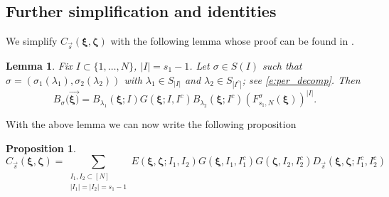 \documentclass[a4paper,11pt]{article}
\newtheorem{proposition}[theorem]{Proposition}
\newtheorem{lemma}[theorem]{Lemma}
\theoremstyle{definition}
\begin{document}
\subsection{Further simplification and identities}
We simplify $C_{\vec{s}}(\boldsymbol{\xi},\boldsymbol{\zeta})$ with the following lemma whose proof can be found in . 
\begin{lemma}\label{l:BDecomp} 
Fix $I\subset\{1,\ldots,N\}$, $|I| = s_1-1$. Let $\sigma\in S(I)$ such that $\sigma=(\sigma_1(\lambda_1),\sigma_2(\lambda_2))$ with $\lambda_1\in S_{|I|}$ and $\lambda_2\in S_{|I^c|}$; see \eqref{e:per_decomp}. Then
    \begin{equation}\label{BDecomp}
        B_\sigma(\vec{\boldsymbol{\xi})} = B_{\lambda_1}(\boldsymbol{\xi};I)G(\boldsymbol{\xi};I,I^c)B_{\lambda_2}(\boldsymbol{\xi};I^c)\left(F_{s_1,N}^{\sigma}(\boldsymbol{\xi})\right)^{|I|}.
    \end{equation}
\end{lemma}



With the above lemma we can now write the following proposition
\begin{proposition}
    \begin{equation}
C_{\vec{s}}(\boldsymbol{\xi}, \boldsymbol{\zeta}) = \sum_{\substack{I_1,I_2 \subset [N]\\|I_1| = |I_2| = s_1-1}} E(\boldsymbol{\xi}, \boldsymbol{\zeta}; I_1, I_2) G(\boldsymbol{\xi},I_1, I_1^c)G(\boldsymbol{\zeta},I_2, I_2^c)D_{\vec{s}}(\boldsymbol{\xi}, \boldsymbol{\zeta}; I_1^c, I_2^c) 
\end{equation}
\end{proposition}
\end{document}
